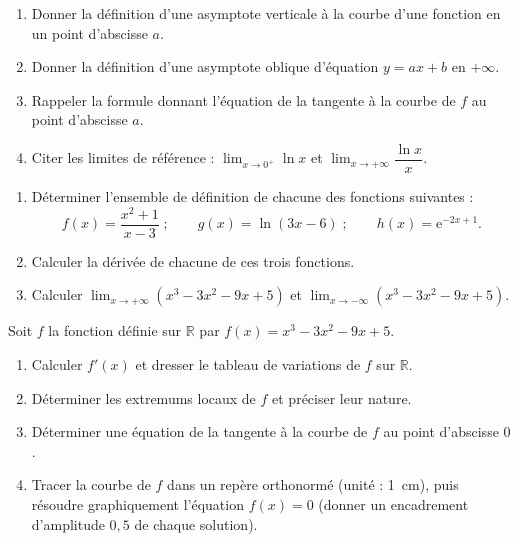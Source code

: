 \documentclass[11pt]{article}
\newcommand{\cle}[1]{{\popxbold\color{popdark}#1}}
\newcounter{popsec}
\newcounter{popsub}
\newcommand{\courssub}[1]{%
  \stepcounter{popsub}%
  \par\vspace{9pt}\noindent{\popxbold\fontsize{11.5}{13}\selectfont\color{popink}{\color{poporange}\thepopsec.\thepopsub}\hspace{6pt}#1}\par\nopagebreak\vspace{4pt}
}
\begin{document}
\begin{exercice}
\begin{enumerate}
\item Donner la définition d'une \cle{asymptote verticale} à la courbe d'une fonction en un point d'abscisse $a$.
\item Donner la définition d'une \cle{asymptote oblique} d'équation $y = ax + b$ en $+\infty$.
\item Rappeler la formule donnant l'équation de la tangente à la courbe de $f$ au point d'abscisse $a$.
\item Citer les limites de référence : $\displaystyle\lim_{x \to 0^+} \ln x$ et $\displaystyle\lim_{x \to +\infty} \dfrac{\ln x}{x}$.
\end{enumerate}
\end{exercice}

\begin{exercice}
\begin{enumerate}
\item Déterminer l'ensemble de définition de chacune des fonctions suivantes :
\[ f(x) = \dfrac{x^2 + 1}{x - 3} \;; \qquad g(x) = \ln(3x - 6) \;; \qquad h(x) = \mathrm{e}^{-2x + 1}. \]
\item Calculer la dérivée de chacune de ces trois fonctions.
\item Calculer $\displaystyle\lim_{x \to +\infty} \left(x^3 - 3x^2 - 9x + 5\right)$ et $\displaystyle\lim_{x \to -\infty} \left(x^3 - 3x^2 - 9x + 5\right)$.
\end{enumerate}
\end{exercice}

\courssub{Je m'entraîne}

\begin{exercice}
Soit $f$ la fonction définie sur $\mathbb{R}$ par $f(x) = x^3 - 3x^2 - 9x + 5$.
\begin{enumerate}
\item Calculer $f'(x)$ et dresser le tableau de variations de $f$ sur $\mathbb{R}$.
\item Déterminer les extremums locaux de $f$ et préciser leur nature.
\item Déterminer une équation de la tangente à la courbe de $f$ au point d'abscisse $0$.
\item Tracer la courbe de $f$ dans un repère orthonormé (unité : \SI{1}{cm}), puis résoudre graphiquement l'équation $f(x) = 0$ (donner un encadrement d'amplitude $0,5$ de chaque solution).
\end{enumerate}
\end{exercice}
\end{document}
